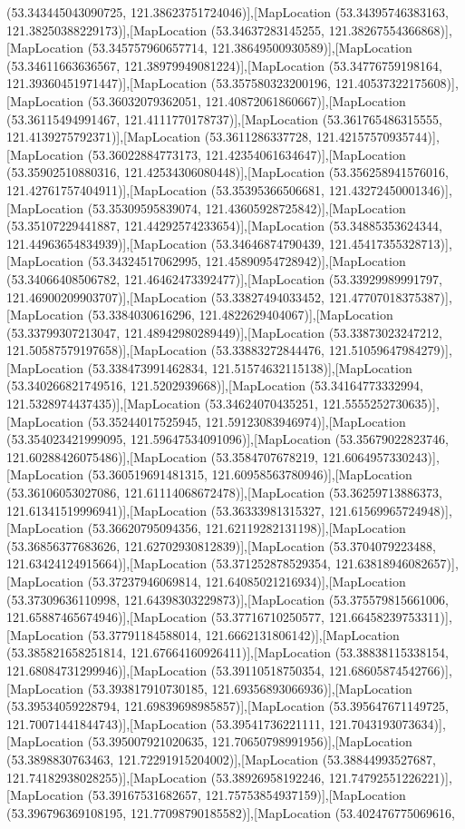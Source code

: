 (53.343445043090725, 121.38623751724046)],[MapLocation (53.34395746383163, 121.38250388229173)],[MapLocation (53.34637283145255, 121.38267554366868)],[MapLocation (53.345757960657714, 121.38649500930589)],[MapLocation (53.34611663636567, 121.38979949081224)],[MapLocation (53.34776759198164, 121.39360451971447)],[MapLocation (53.357580323200196, 121.40537322175608)],[MapLocation (53.36032079362051, 121.40872061860667)],[MapLocation (53.36115494991467, 121.4111770178737)],[MapLocation (53.361765486315555, 121.4139275792371)],[MapLocation (53.3611286337728, 121.42157570935744)],[MapLocation (53.36022884773173, 121.42354061634647)],[MapLocation (53.35902510880316, 121.42534306080448)],[MapLocation (53.356258941576016, 121.42761757404911)],[MapLocation (53.35395366506681, 121.43272450001346)],[MapLocation (53.35309595839074, 121.43605928725842)],[MapLocation (53.35107229441887, 121.44292574233654)],[MapLocation (53.34885353624344, 121.44963654834939)],[MapLocation (53.34646874790439, 121.45417355328713)],[MapLocation (53.34324517062995, 121.45890954728942)],[MapLocation (53.34066408506782, 121.46462473392477)],[MapLocation (53.33929989991797, 121.46900209903707)],[MapLocation (53.33827494033452, 121.47707018375387)],[MapLocation (53.3384030616296, 121.4822629404067)],[MapLocation (53.33799307213047, 121.48942980289449)],[MapLocation (53.33873023247212, 121.50587579197658)],[MapLocation (53.33883272844476, 121.51059647984279)],[MapLocation (53.338473991462834, 121.51574632115138)],[MapLocation (53.340266821749516, 121.5202939668)],[MapLocation (53.34164773332994, 121.5328974437435)],[MapLocation (53.34624070435251, 121.5555252730635)],[MapLocation (53.35244017525945, 121.59123083946974)],[MapLocation (53.354023421999095, 121.59647534091096)],[MapLocation (53.35679022823746, 121.60288426075486)],[MapLocation (53.3584707678219, 121.6064957330243)],[MapLocation (53.360519691481315, 121.60958563780946)],[MapLocation (53.36106053027086, 121.61114068672478)],[MapLocation (53.36259713886373, 121.61341519996941)],[MapLocation (53.36333981315327, 121.61569965724948)],[MapLocation (53.36620795094356, 121.62119282131198)],[MapLocation (53.36856377683626, 121.62702930812839)],[MapLocation (53.3704079223488, 121.63424124915664)],[MapLocation (53.371252878529354, 121.63818946082657)],[MapLocation (53.37237946069814, 121.64085021216934)],[MapLocation (53.37309636110998, 121.64398303229873)],[MapLocation (53.375579815661006, 121.65887465674946)],[MapLocation (53.37716710250577, 121.66458239753311)],[MapLocation (53.37791184588014, 121.6662131806142)],[MapLocation (53.385821658251814, 121.67664160926411)],[MapLocation (53.38838115338154, 121.68084731299946)],[MapLocation (53.39110518750354, 121.68605874542766)],[MapLocation (53.393817910730185, 121.69356893066936)],[MapLocation (53.39534059228794, 121.69839698985857)],[MapLocation (53.395647671149725, 121.70071441844743)],[MapLocation (53.39541736221111, 121.7043193073634)],[MapLocation (53.395007921020635, 121.70650798991956)],[MapLocation (53.3898830763463, 121.72291915204002)],[MapLocation (53.38844993527687, 121.74182938028255)],[MapLocation (53.38926958192246, 121.74792551226221)],[MapLocation (53.39167531682657, 121.75753854937159)],[MapLocation (53.396796369108195, 121.77098790185582)],[MapLocation (53.402476775069616, 
